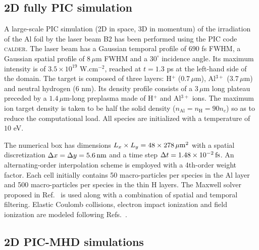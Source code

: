 \documentclass[aps,twocolumn,showpacs,superscriptaddress]{revtex4}
\begin{document}
\subsection*{2D fully PIC simulation}

A large-scale PIC simulation (2D in space, 3D in momentum) of the irradiation of the Al foil by the laser beam B2 has been performed using the PIC code \textsc{calder}. The laser beam has a Gaussian temporal profile of $690$ fs FWHM, a Gaussian spatial profile of $8\, \mu$m FWHM and a $30^\circ$ incidence angle. Its maximum intensity is of $3.5 \times 10^{19}$ W.cm$^{-2}$, reached at $t=1.3$ ps at the left-hand side of the domain. The target is composed of three layers: H$^+$ ($0.7\,\mu$m), Al$^{3+}$ ($3.7\,\mu$m) and neutral hydrogen ($6$ nm). Its density profile consists of a $3\, \mu$m long plateau preceded by a $1.4\,\mu$m-long preplasma made of H$^+$ and Al$^{3+}$ ions. The maximum ion target density is taken to be half the solid density ($n_\mathrm{Al}=n_\mathrm{H}=90 n_c$) so as to reduce the computational load. All species are initialized with a temperature of $10$ eV.

The numerical box has dimensions $L_x \times L_y = 48 \times 278\,\rm \mu m^2$ with a spatial discretization $\Delta x = \Delta y = 5.6\,\rm nm$ and a time step $\Delta t = 1.48\times 10^{-2}\,\rm fs$. An alternating-order interpolation scheme \cite{CPC_Sokolov_2013} is employed with a 4th-order weight factor. Each cell initially contains 50 macro-particles per species in the Al layer and 500 macro-particles per species in the thin H layers. The Maxwell solver proposed in Ref.~\cite{PRSTAB_Lehe_2013} is used along with a combination of spatial \cite{JCP_Vay_2011} and temporal \cite{JCP_Friedman_1990} filtering. Elastic Coulomb collisions, electron impact ionization and field ionization are modeled following Refs.~\cite{POP_Perez_2012}.

\subsection*{2D PIC-MHD simulations}
\end{document}
